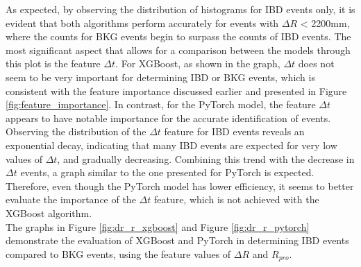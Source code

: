As expected, by observing the distribution of histograms for IBD events only, it is evident that both algorithms perform accurately for events with $\Delta R$ < 2200mm, where the counts for BKG events begin to surpass the counts of IBD events. The most significant aspect that allows for a comparison between the models through this plot is the feature $\Delta t$. For XGBoost, as shown in the graph, $\Delta t$ does not seem to be very important for determining IBD or BKG events, which is consistent with the feature importance discussed earlier and presented in Figure \ref{fig:feature_importance}. In contrast, for the PyTorch model, the feature $\Delta t$ appears to have notable importance for the accurate identification of events. 
Observing the distribution of the $\Delta t$ feature for IBD events reveals an exponential decay, indicating that many IBD events are expected for very low values of $\Delta t$, and gradually decreasing. Combining this trend with the decrease in $\Delta t$ events, a graph similar to the one presented for PyTorch is expected. Therefore, even though the PyTorch model has lower efficiency, it seems to better evaluate the importance of the $\Delta t$ feature, which is not achieved with the XGBoost algorithm.\\


The graphs in Figure \ref{fig:dr_r_xgboost} and Figure \ref{fig:dr_r_pytorch} demonstrate the evaluation of XGBoost and PyTorch in determining IBD events compared to BKG events, using the feature values of $\Delta R$ and $R_{pro}$.  \\

